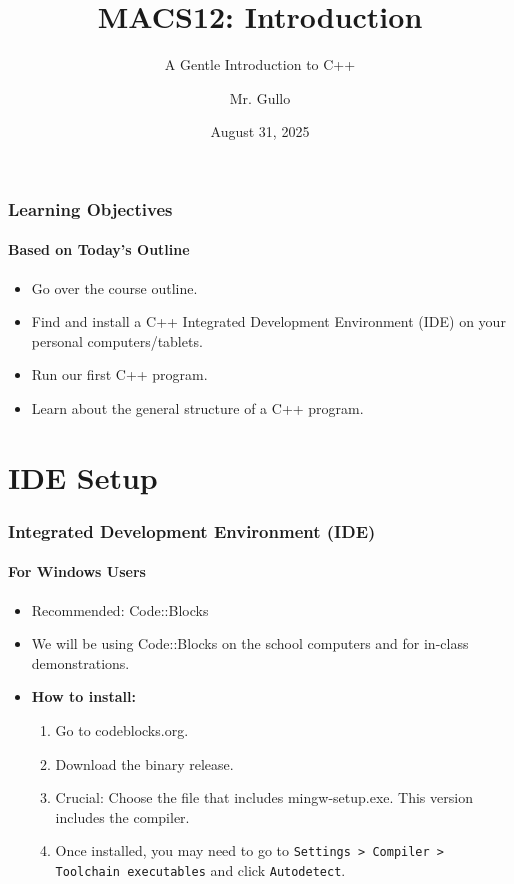 \documentclass{beamer}
\title[Intro to C++]{MACS12: Introduction}
\subtitle{A Gentle Introduction to C++}
\author[Mr. Gullo]{Mr. Gullo}
\date[Aug 31, 2025]{August 31, 2025}
\begin{document}
\frame{\titlepage}

\begin{frame}
\frametitle{Learning Objectives}
\framesubtitle{Based on Today's Outline}
\begin{itemize}
\item Go over the course outline.
\item Find and install a C++ Integrated Development Environment (IDE) on your personal computers/tablets.
\item Run our first C++ program.
\item Learn about the general structure of a C++ program.
\end{itemize}
\end{frame}

\section{IDE Setup}

\begin{frame}
\frametitle{Integrated Development Environment (IDE)}
\framesubtitle{For Windows Users}
\begin{itemize}
\item \alert{Recommended:} Code::Blocks
\item We will be using Code::Blocks on the school computers and for in-class demonstrations.
\item \textbf{How to install:}
\begin{enumerate}
\item Go to \alert{codeblocks.org}.
\item Download the binary release.
\item \alert{Crucial:} Choose the file that includes mingw-setup.exe. This version includes the compiler.
\item Once installed, you may need to go to \texttt{Settings > Compiler > Toolchain executables} and click \texttt{Autodetect}.
\end{enumerate}
\end{itemize}
\end{frame}
\end{document}
